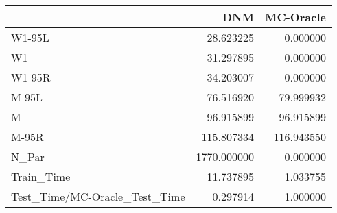 \begin{tabular}{lrr}
\toprule
{} &          DNM &   MC-Oracle \\
\midrule
W1-95L                        &    28.623225 &    0.000000 \\
W1                            &    31.297895 &    0.000000 \\
W1-95R                        &    34.203007 &    0.000000 \\
M-95L                         &    76.516920 &   79.999932 \\
M                             &    96.915899 &   96.915899 \\
M-95R                         &   115.807334 &  116.943550 \\
N\_Par                         &  1770.000000 &    0.000000 \\
Train\_Time                    &    11.737895 &    1.033755 \\
Test\_Time/MC-Oracle\_Test\_Time &     0.297914 &    1.000000 \\
\bottomrule
\end{tabular}
